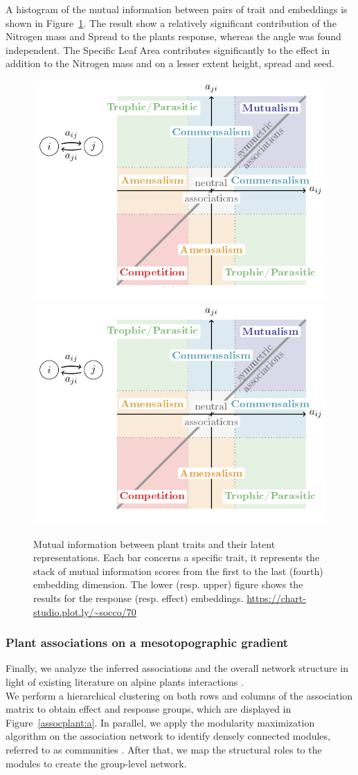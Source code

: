 \documentclass[10pt,a4paper]{article}
\newcommand{\inclPlt}[2]{\includegraphics[page=#1]{tikz_figures.pdf}}
\begin{document}
A histogram of the mutual information between pairs of trait and embeddings is shown in Figure~\ref{mitraitemb}.  The result show a relatively significant contribution of the Nitrogen mass and Spread to the plants response, whereas the angle was found independent. The Specific Leaf Area contributes significantly to the effect in addition to the Nitrogen mass and on a lesser extent height, spread and seed.\\


\begin{figure}[bthp]
  \inclPlt{9}{hist_AlpsMIEff}
  \inclPlt{10}{hist_AlpsMIRes}
	\caption{Mutual information between plant traits and their latent representations. Each bar concerns a specific trait, it represents the stack of mutual information scores from the first to the last (fourth) embedding dimension. The lower (resp. upper) figure shows the results for the response (resp. effect) embeddings. \url{https://chart-studio.plot.ly/~socco/70}} \label{mitraitemb}
\end{figure}

\subsubsection{Plant associations on a mesotopographic gradient}
Finally, we analyze the inferred associations and the overall network structure in light of existing literature on alpine plants interactions \cite{choler2001facilitation}.\\

We perform a hierarchical clustering on both rows and columns of the association matrix to obtain effect and response groups, which are displayed in Figure~\ref{assocplant:a}. In parallel, we apply the modularity maximization algorithm on the association network to identify densely connected modules, referred to as communities \cite{gauzens2015trophic}. After that, we map the structural roles to the modules to create the group-level network.\\

\end{document}
